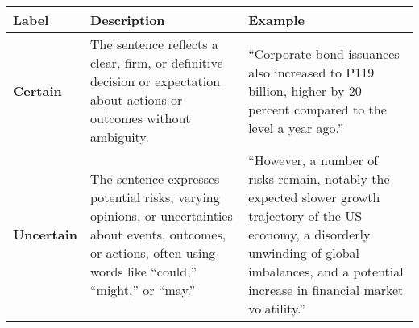 \begin{table*}
    \caption{}
    \begin{tabular}{p{}p{}p{}}
    \toprule
    \textbf{Label} & \textbf{Description} & \textbf{Example}\\
    \midrule
    \textbf{Certain} & The sentence reflects a clear, firm, or definitive
    decision or expectation about actions or outcomes without ambiguity. & “Corporate bond issuances also increased to P119 billion, higher by 20   percent compared to the level a year ago.” \\
    \midrule
    \textbf{Uncertain} & The sentence expresses potential risks, varying opinions, or uncertainties about events, outcomes, or actions, often using words like “could,” “might,” or “may.” & “However, a number of risks remain, notably the expected slower growth trajectory of the US economy, a disorderly unwinding of global imbalances, and a potential increase in financial market volatility.” \\
    \bottomrule
    \end{tabular}
    \label{tb:bsp_certainty_guide}
    \end{table*}